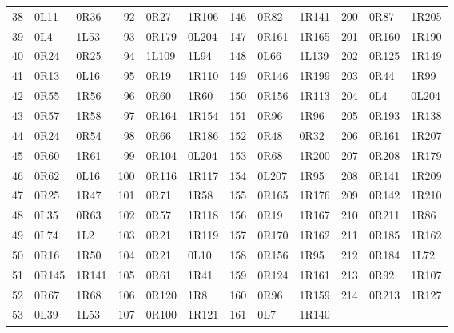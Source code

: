 \begin{longtable}{rll@{\hspace{1em}}rll@{\hspace{1em}}rll@{\hspace{1em}}rll}
38 & 0L11 & 0R36 & 92 & 0R27 & 1R106 & 146 & 0R82 & 1R141 & 200 & 0R87 & 1R205\\
39 & 0L4 & 1L53 & 93 & 0R179 & 0L204 & 147 & 0R161 & 1R165 & 201 & 0R160 & 1R190\\
40 & 0R24 & 0R25 & 94 & 1L109 & 1L94 & 148 & 0L66 & 1L139 & 202 & 0R125 & 1R149\\
41 & 0R13 & 0L16 & 95 & 0R19 & 1R110 & 149 & 0R146 & 1R199 & 203 & 0R44 & 1R99\\
42 & 0R55 & 1R56 & 96 & 0R60 & 1R60 & 150 & 0R156 & 1R113 & 204 & 0L4 & 0L204\\
43 & 0R57 & 1R58 & 97 & 0R164 & 1R154 & 151 & 0R96 & 1R96 & 205 & 0R193 & 1R138\\
44 & 0R24 & 0R54 & 98 & 0R66 & 1R186 & 152 & 0R48 & 0R32 & 206 & 0R161 & 1R207\\
45 & 0R60 & 1R61 & 99 & 0R104 & 0L204 & 153 & 0R68 & 1R200 & 207 & 0R208 & 1R179\\
46 & 0R62 & 0L16 & 100 & 0R116 & 1R117 & 154 & 0L207 & 1R95 & 208 & 0R141 & 1R209\\
47 & 0R25 & 1R47 & 101 & 0R71 & 1R58 & 155 & 0R165 & 1R176 & 209 & 0R142 & 1R210\\
48 & 0L35 & 0R63 & 102 & 0R57 & 1R118 & 156 & 0R19 & 1R167 & 210 & 0R211 & 1R86\\
49 & 0L74 & 1L2 & 103 & 0R21 & 1R119 & 157 & 0R170 & 1R162 & 211 & 0R185 & 1R162\\
50 & 0R16 & 1R50 & 104 & 0R21 & 0L10 & 158 & 0R156 & 1R95 & 212 & 0R184 & 1L72\\
51 & 0R145 & 1R141 & 105 & 0R61 & 1R41 & 159 & 0R124 & 1R161 & 213 & 0R92 & 1R107\\
52 & 0R67 & 1R68 & 106 & 0R120 & 1R8 & 160 & 0R96 & 1R159 & 214 & 0R213 & 1R127\\
53 & 0L39 & 1L53 & 107 & 0R100 & 1R121 & 161 & 0L7 & 1R140 &  &  & \\
\end{longtable}
\endgroup
